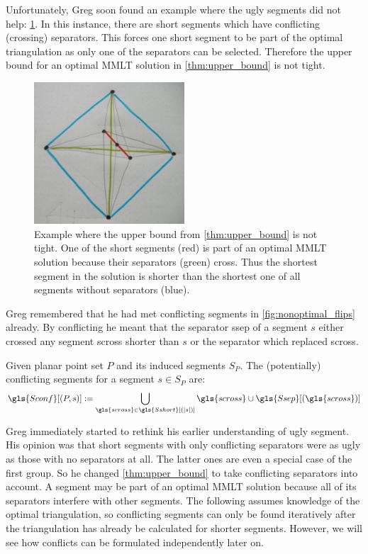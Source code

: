 Unfortunately, Greg soon found an example where the ugly segments did
not help: \cref{fig:upper_bound_tightness}. In this instance, there
are short segments which have conflicting (crossing) separators. This
forces one short segment to be part of the optimal triangulation as
only one of the separators can be selected. Therefore the upper bound
for an optimal \gls{MMLT} solution in \cref{thm:upper_bound} is not
tight.

\begin{figure}[ht]
  \centering
  \includegraphics[width=0.5\textwidth]{img/upper_bound_tightness.jpg}
  \caption{
    \label{fig:upper_bound_tightness}
    Example where the upper bound from \cref{thm:upper_bound} is not 
    tight. One of the short segments (red) is part of an optimal 
    \gls{MMLT} solution because their separators (green) cross. Thus
    the shortest segment in the solution is shorter than the shortest
    one of all segments without separators (blue).
  }
\end{figure}  

Greg remembered that he had met conflicting segments in 
\cref{fig:nonoptimal_flips} already. By conflicting he meant that the
separator \gls{ssep} of a segment \(s\) either crossed any segment
\gls{scross} shorter than \(s\) or the separator which replaced
\gls{scross}. 

\begin{definition}\label{def:conflicting_segments}
  Given planar point set \(P\) and its induced segments \(S_P\). The
  (potentially) conflicting segments for a segment \(s \in S_P\) are:
  \[
    \gls{Sconf}[(P,s)] :=
      \bigcup_{\gls{scross} \in \gls{Sshort}[(|s|)]}
      \gls{scross} \cup \gls{Ssep}[(\gls{scross})]
  \]
\end{definition}

Greg immediately started to rethink his earlier understanding of ugly
segment. His opinion was that short segments with only conflicting
separators were as ugly as those with no separators at all. The latter
ones are even a special case of the first group. So he changed
\cref{thm:upper_bound} to take conflicting separators into account. A 
segment may be part of an optimal \gls{MMLT} solution because all of
its separators interfere with other segments. The following
assumes knowledge of the optimal triangulation, so conflicting segments 
can only be found iteratively after the triangulation has already be 
calculated for shorter segments. However, we will see how conflicts can 
be formulated independently later on.

